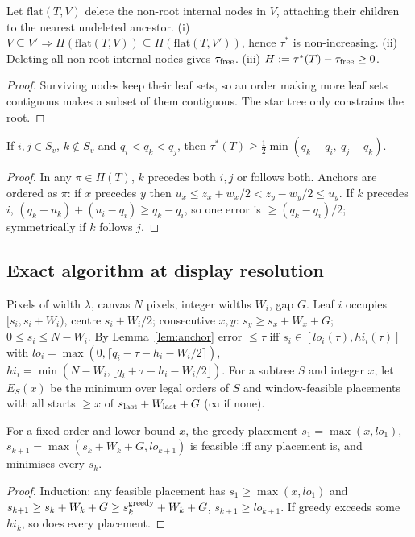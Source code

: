 \begin{proposition}\label{prop:mono}
Let $\mathrm{flat}(T,V)$ delete the non-root internal nodes in $V$, attaching their children to the nearest undeleted ancestor. (i) $V\subseteq V'\Rightarrow\Pi(\mathrm{flat}(T,V))\subseteq\Pi(\mathrm{flat}(T,V'))$, hence $\tau^*$ is non-increasing. (ii) Deleting all non-root internal nodes gives $\tau_{\rm free}$. (iii) $H:=\tau^*(T)-\tau_{\rm free}\ge0$.
\end{proposition}
\begin{proof}Surviving nodes keep their leaf sets, so an order making more leaf sets contiguous makes a subset of them contiguous. The star tree only constrains the root.\end{proof}

\begin{proposition}\label{prop:witness}
If $i,j\in S_v$, $k\notin S_v$ and $q_i<q_k<q_j$, then $\tau^*(T)\ge\tfrac12\min(q_k-q_i,\ q_j-q_k)$.
\end{proposition}
\begin{proof}In any $\pi\in\Pi(T)$, $k$ precedes both $i,j$ or follows both. Anchors are ordered as $\pi$: if $x$ precedes $y$ then $u_x\le z_x+w_x/2<z_y-w_y/2\le u_y$. If $k$ precedes $i$, $(q_k-u_k)+(u_i-q_i)\ge q_k-q_i$, so one error is $\ge(q_k-q_i)/2$; symmetrically if $k$ follows $j$.\end{proof}

\subsection{Exact algorithm at display resolution}
Pixels of width $\lambda$, canvas $N$ pixels, integer widths $W_i$, gap $G$. Leaf $i$ occupies $[s_i,s_i+W_i)$, centre $s_i+W_i/2$; consecutive $x,y$: $s_y\ge s_x+W_x+G$; $0\le s_i\le N-W_i$. By Lemma~\ref{lem:anchor} error $\le\tau$ iff $s_i\in[lo_i(\tau),hi_i(\tau)]$ with $lo_i=\max(0,\lceil q_i-\tau-h_i-W_i/2\rceil)$, $hi_i=\min(N-W_i,\lfloor q_i+\tau+h_i-W_i/2\rfloor)$.
For a subtree $S$ and integer $x$, let $E_S(x)$ be the minimum over legal orders of $S$ and window-feasible placements with all starts $\ge x$ of $s_{\rm last}+W_{\rm last}+G$ ($\infty$ if none).

\begin{lemma}\label{lem:greedy}For a fixed order and lower bound $x$, the greedy placement $s_1=\max(x,lo_1)$, $s_{k+1}=\max(s_k+W_k+G,lo_{k+1})$ is feasible iff any placement is, and minimises every $s_k$.\end{lemma}
\begin{proof}Induction: any feasible placement has $s_1\ge\max(x,lo_1)$ and $s_{k+1}\ge s_k+W_k+G\ge s_k^{\rm greedy}+W_k+G$, $s_{k+1}\ge lo_{k+1}$. If greedy exceeds some $hi_k$, so does every placement.\end{proof}

